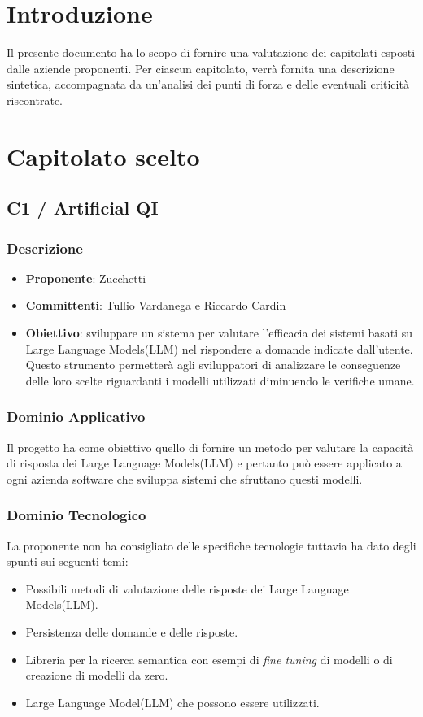 \documentclass[a4paper, 12pt]{article}
\begin{document}
\tableofcontents

\newpage

\section{Introduzione}
Il presente documento ha lo scopo di fornire una valutazione dei capitolati esposti dalle aziende proponenti.
Per ciascun capitolato, verrà fornita una descrizione sintetica, accompagnata da un’analisi dei punti di forza e delle eventuali criticità riscontrate.

\section{Capitolato scelto}

\subsection{C1 / Artificial QI}
\subsubsection{Descrizione}
\begin{itemize}
    \item \textbf{Proponente}: Zucchetti
    \item \textbf{Committenti}: Tullio Vardanega e Riccardo Cardin
    \item \textbf{Obiettivo}: sviluppare un sistema per valutare l'efficacia dei sistemi basati su Large Language Models(LLM) nel rispondere a domande indicate dall’utente. 
    Questo strumento permetterà agli sviluppatori di analizzare le conseguenze delle loro scelte riguardanti i modelli utilizzati diminuendo le verifiche umane.     
\end{itemize}

\subsubsection{Dominio Applicativo}
Il progetto ha come obiettivo quello di fornire un metodo per valutare la capacità di risposta dei Large Language Models(LLM) e pertanto può essere applicato a ogni azienda software che sviluppa sistemi che sfruttano questi modelli.

\subsubsection{Dominio Tecnologico}
La proponente non ha consigliato delle specifiche tecnologie tuttavia ha dato degli spunti sui seguenti temi:
\begin{itemize}
    \item Possibili metodi di valutazione delle risposte dei Large Language Models(LLM).
    \item Persistenza delle domande e delle risposte.
    \item Libreria per la ricerca semantica con esempi di \textit{fine tuning} di modelli o di creazione di modelli da zero.
    \item Large Language Model(LLM) che possono essere utilizzati.
\end{itemize}
\end{document}
